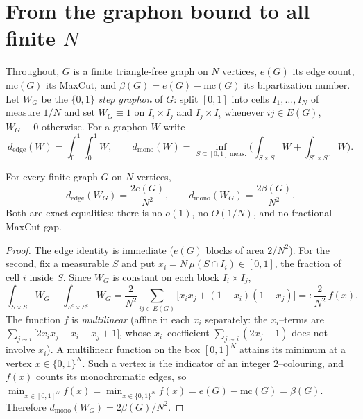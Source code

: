 \section{From the graphon bound to all finite \texorpdfstring{$N$}{N}}\label{sec:allN}

Throughout, $G$ is a finite triangle-free graph on $N$ vertices, $e(G)$ its edge
count, $\mathrm{mc}(G)$ its MaxCut, and $\beta(G)=e(G)-\mathrm{mc}(G)$ its
bipartization number. Let $W_G$ be the $\{0,1\}$ \emph{step graphon} of $G$: split
$[0,1]$ into cells $I_1,\dots,I_N$ of measure $1/N$ and set $W_G\equiv 1$ on
$I_i\times I_j$ and $I_j\times I_i$ whenever $ij\in E(G)$, $W_G\equiv 0$ otherwise.
For a graphon $W$ write
\[
  d_{\mathrm{edge}}(W)=\int_0^1\!\!\int_0^1 W,\qquad
  d_{\mathrm{mono}}(W)=\inf_{S\subseteq[0,1]\ \text{meas.}}
      \Big(\int_{S\times S}W+\int_{S^c\times S^c}W\Big).
\]

\begin{lemma}\label{lem:transfer}
For every finite graph $G$ on $N$ vertices,
\[
  d_{\mathrm{edge}}(W_G)=\frac{2e(G)}{N^2},\qquad
  d_{\mathrm{mono}}(W_G)=\frac{2\beta(G)}{N^2}.
\]
Both are exact equalities: there is no $o(1)$, no $O(1/N)$, and no fractional--MaxCut
gap.
\end{lemma}

\begin{proof}
The edge identity is immediate ($e(G)$ blocks of area $2/N^2$). For the second, fix a
measurable $S$ and put $x_i=N\,\mu(S\cap I_i)\in[0,1]$, the fraction of cell $i$ inside
$S$. Since $W_G$ is constant on each block $I_i\times I_j$,
\[
  \int_{S\times S}W_G+\int_{S^c\times S^c}W_G
  =\frac{2}{N^2}\sum_{ij\in E(G)}\big[x_ix_j+(1-x_i)(1-x_j)\big]
  =:\frac{2}{N^2}\,f(x).
\]
The function $f$ is \emph{multilinear} (affine in each $x_i$ separately: the
$x_i$--terms are $\sum_{j\sim i}\big[2x_ix_j-x_i-x_j+1\big]$, whose $x_i$--coefficient
$\sum_{j\sim i}(2x_j-1)$ does not involve $x_i$). A multilinear function on the box
$[0,1]^N$ attains its minimum at a vertex $x\in\{0,1\}^N$. Such a vertex is the
indicator of an integer $2$--colouring, and $f(x)$ counts its monochromatic edges, so
$\min_{x\in[0,1]^N}f(x)=\min_{x\in\{0,1\}^N}f(x)=e(G)-\mathrm{mc}(G)=\beta(G)$.
Therefore $d_{\mathrm{mono}}(W_G)=2\beta(G)/N^2$.
\end{proof}

